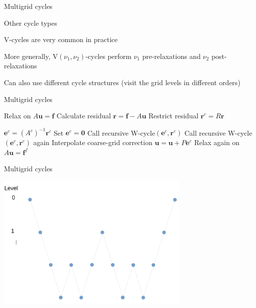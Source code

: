 \documentclass[18pt,xcolor=table]{beamer}
\begin{document}
\begin{frame}{Multigrid cycles}
\begin{block}{Other cycle types}
\bit
\item V-cycles are very common in practice
\item More generally, V$(\nu_1, \nu_2)$-cycles perform $\nu_1$ pre-relaxations and $\nu_2$ post-relaxations
\item Can also use different cycle structures (visit the grid levels in different orders)
\eit
\end{block}
\end{frame}

\begin{frame}{Multigrid cycles}
\begin{algorithm}[H]
\caption{Recursive W-cycle$(\mathbf{u},\mathbf{f})$}
\begin{algorithmic}
\State Relax on $A\mathbf{u} = \mathbf{f}$
\State Calculate residual $\mathbf{r} = \mathbf{f} - A\mathbf{u}$
\State Restrict residual $\mathbf{r}^c = R\mathbf{r}$

\State $\mathbf{e}^c = (A^c)^{-1}\mathbf{r}^c$
\Else
\State Set $\mathbf{e}^c = \mathbf{0}$
\State Call recursive W-cycle$(\mathbf{e}^c, \mathbf{r}^c)$
\State Call recursive W-cycle$(\mathbf{e}^c, \mathbf{r}^c)$ again
\EndIf
\State Interpolate coarse-grid correction $\mathbf{u} = \mathbf{u} + P\mathbf{e}^c$
\State Relax again on $A\mathbf{u} = \mathbf{f}^f$
\end{algorithmic}
\end{algorithm}
\end{frame}

\begin{frame}{Multigrid cycles}
\begin{center}
\includegraphics[width=0.7\textwidth]{../figures/Wcycle}
\end{center}
\end{frame}
\end{document}
